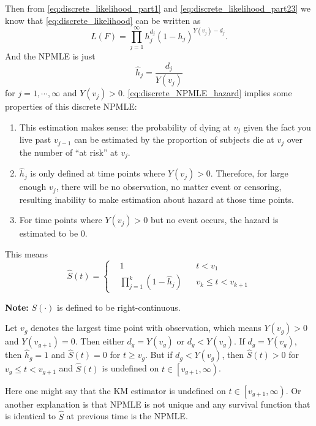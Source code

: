 \documentclass[a4paper,12pt]{article}
\begin{document}
\par
Then from \eqref{eq:discrete_likelihood_part1} and \eqref{eq:discrete_likelihood_part23} we know that \eqref{eq:discrete_likelihood} can be written as
\begin{equation}
  \label{eq:discrete_likelihood_rewrite}
  L\left(F\right) = \prod\limits_{j = 1}^{\infty}h_j^{d_j}\left(1 - h_j\right)^{Y\left(v_j\right) - d_j}
  .
\end{equation}
And the NPMLE is just
\begin{equation}
  \label{eq:discrete_NPMLE_hazard}
  \hat{h}_j = \frac{d_j}{Y\left(v_j\right)}
\end{equation}
for $j = 1, \cdots, \infty$ and $Y\left(v_j\right) > 0$. \eqref{eq:discrete_NPMLE_hazard} implies some properties of this discrete NPMLE:
\begin{enumerate}
\item This estimation makes sense: the probability of dying at $v_j$ given the fact you live past $v_{j - 1}$ can be estimated by the proportion of subjects die at $v_j$ over the number of ``at risk'' at $v_j$.
\item $\hat{h}_j$ is only defined at time points where $Y\left(v_j\right) > 0$. Therefore, for large enough $v_j$, there will be no observation, no matter event or censoring, resulting inability to make estimation about hazard at those time points.
\item For time points where $Y\left(v_j\right) >0$ but no event occurs, the hazard is estimated to be 0.
\end{enumerate}
This means
\begin{equation}
  \label{eq:discrete_NPMLE}
  \hat{S}\left(t\right) =\left\{
  \begin{aligned}    
    & 1 && t < v_1    \\
    & \prod\limits_{j = 1}^{k}\left(1 - \hat{h}_j\right) && v_{k} \leq t < v_{k + 1}
  \end{aligned}
  \right.  
\end{equation}

\textbf{Note: } $S\left(\cdot\right)$ is defined to be {\color{red} right-continuous}.
\par
Let $v_g$ denotes the largest time point with observation, which means $Y\left(v_g\right) > 0$ and $Y\left(v_{g+ 1}\right) = 0$. Then either $d_g = Y\left(v_g\right)$ or $d_g < Y\left(v_g\right)$. If $d_g = Y\left(v_g\right)$, then $\hat{h}_g = 1$ and $\hat{S}\left(t\right) = 0$ for $t \geq v_g$. But if $d_g < Y\left(v_g\right)$, then $\hat{S}\left(t\right) > 0$ for $v_g \leq t < v_{g+1}$ and $\hat{S}\left(t\right)$ is undefined on $t\in\left[v_{g + 1}, \infty\right)$.
\par
Here one might say that the KM estimator is undefined on $t\in\left[v_{g+ 1}, \infty\right)$. Or another explanation is that NPMLE is not unique and any survival function that is identical to $\hat{S}$ at previous time is the NPMLE.
\end{document}
